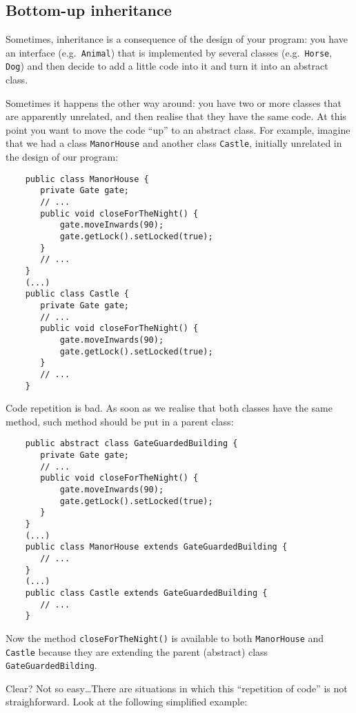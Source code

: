 \subsection{Bottom-up inheritance}
\label{sec:boot-up-inher}

Sometimes, inheritance is a consequence of the design of your
program: you have an interface (e.g.~\verb+Animal+) 
that is implemented by several classes (e.g.~\verb+Horse+, \verb+Dog+)
and then decide to add a little code into it and turn it into an
abstract class. 

Sometimes it happens the other way around: you have two or
more classes that are apparently unrelated, and then realise that they
have the same code. At this point you want to move the code ``up'' to
an abstract class. For example, imagine that we had a class
\verb+ManorHouse+ and another class \verb+Castle+, initially unrelated
in the design of our program: 

\begin{verbatim}
    public class ManorHouse {
       private Gate gate;
       // ...
       public void closeForTheNight() {
           gate.moveInwards(90);
           gate.getLock().setLocked(true);
       }
       // ...
    }
    (...)
    public class Castle {
       private Gate gate;
       // ...
       public void closeForTheNight() {
           gate.moveInwards(90);
           gate.getLock().setLocked(true);
       }
       // ...
    }       
\end{verbatim}

Code repetition is bad. As soon as we realise that both classes have
the same method, such method should be put in a parent class: 

\begin{verbatim}
    public abstract class GateGuardedBuilding {
       private Gate gate;
       // ...
       public void closeForTheNight() {
           gate.moveInwards(90);
           gate.getLock().setLocked(true);
       }
    }
    (...)
    public class ManorHouse extends GateGuardedBuilding {
       // ...
    }
    (...)
    public class Castle extends GateGuardedBuilding {
       // ...
    }       
\end{verbatim}

Now the method \verb+closeForTheNight()+ is available to both
\verb+ManorHouse+ and \verb+Castle+ because they are extending
the parent (abstract) class \verb+GateGuardedBilding+. 

Clear? Not so easy\ldots There are situations in which 
this ``repetition of code'' is not straighforward. Look at the
following simplified example:  

